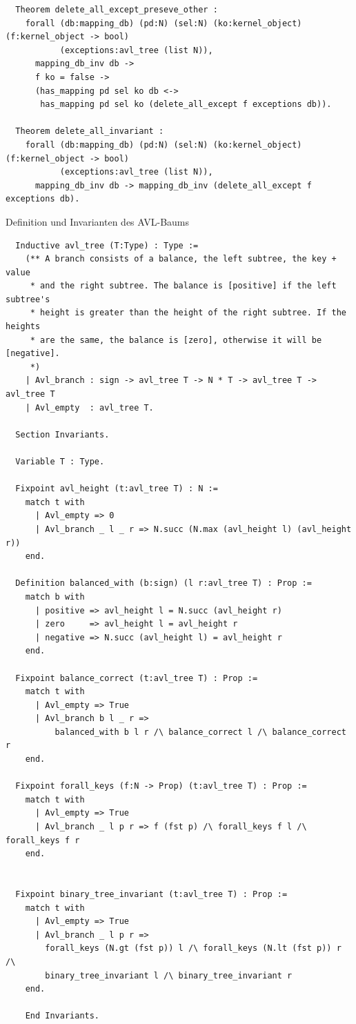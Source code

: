\documentclass[a4paper, parskip]{scrartcl}
\newenvironment{code}{\captionsetup{type=listing}}{}
\begin{document}
\begin{code}
\begin{verbatim}
  Theorem delete_all_except_preseve_other :
    forall (db:mapping_db) (pd:N) (sel:N) (ko:kernel_object) (f:kernel_object -> bool)
           (exceptions:avl_tree (list N)),
      mapping_db_inv db ->
      f ko = false ->
      (has_mapping pd sel ko db <->
       has_mapping pd sel ko (delete_all_except f exceptions db)).

  Theorem delete_all_invariant :
    forall (db:mapping_db) (pd:N) (sel:N) (ko:kernel_object) (f:kernel_object -> bool)
           (exceptions:avl_tree (list N)),
      mapping_db_inv db -> mapping_db_inv (delete_all_except f exceptions db).
  \end{verbatim}
\end{code}

\begin{code}
  \caption{Definition und Invarianten des AVL-Baums}
  \label{lst:avl-def}

  \begin{verbatim}
  Inductive avl_tree (T:Type) : Type :=
    (** A branch consists of a balance, the left subtree, the key + value 
     * and the right subtree. The balance is [positive] if the left subtree's
     * height is greater than the height of the right subtree. If the heights 
     * are the same, the balance is [zero], otherwise it will be [negative].
     *)
    | Avl_branch : sign -> avl_tree T -> N * T -> avl_tree T -> avl_tree T
    | Avl_empty  : avl_tree T.

  Section Invariants.

  Variable T : Type.

  Fixpoint avl_height (t:avl_tree T) : N :=
    match t with
      | Avl_empty => 0
      | Avl_branch _ l _ r => N.succ (N.max (avl_height l) (avl_height r))
    end.

  Definition balanced_with (b:sign) (l r:avl_tree T) : Prop :=
    match b with
      | positive => avl_height l = N.succ (avl_height r)
      | zero     => avl_height l = avl_height r
      | negative => N.succ (avl_height l) = avl_height r
    end.
  
  Fixpoint balance_correct (t:avl_tree T) : Prop :=
    match t with
      | Avl_empty => True
      | Avl_branch b l _ r => 
          balanced_with b l r /\ balance_correct l /\ balance_correct r
    end.

  Fixpoint forall_keys (f:N -> Prop) (t:avl_tree T) : Prop :=
    match t with
      | Avl_empty => True
      | Avl_branch _ l p r => f (fst p) /\ forall_keys f l /\ forall_keys f r
    end.


  Fixpoint binary_tree_invariant (t:avl_tree T) : Prop :=
    match t with
      | Avl_empty => True
      | Avl_branch _ l p r =>
        forall_keys (N.gt (fst p)) l /\ forall_keys (N.lt (fst p)) r /\
        binary_tree_invariant l /\ binary_tree_invariant r
    end.

    End Invariants.
  \end{verbatim}
\end{code}
\end{document}
